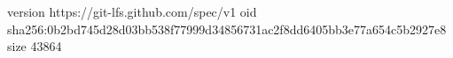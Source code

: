 version https://git-lfs.github.com/spec/v1
oid sha256:0b2bd745d28d03bb538f77999d34856731ac2f8dd6405bb3e77a654c5b2927e8
size 43864
